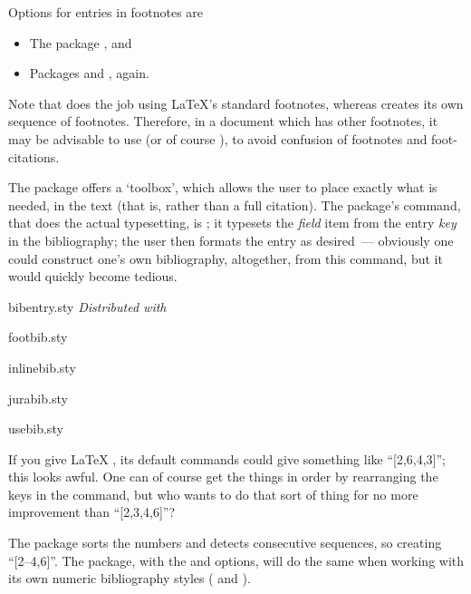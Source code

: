 Options for entries in footnotes are
\begin{itemize}
\item The package , and
\item Packages  and , again.
\end{itemize}
Note that  does the job using \LaTeX{}'s standard
footnotes, whereas  creates its own sequence of
footnotes.  Therefore, in a document which has other footnotes, it may
be advisable to use  (or of course
), to avoid confusion of footnotes and
foot-citations.

The  package offers a `toolbox', which allows the user
to place exactly what is needed, in the text (that is, rather than a
full citation).  The package's command, that does the actual
typesetting, is ; it
typesets the \emph{field} item from the entry \emph{key} in the
bibliography; the user then formats the entry as desired~--- obviously
one could construct one's own bibliography, altogether, from this
command, but it would quickly become tedious.
\begin{ctanrefs}
\item[bibentry.sty]\emph{Distributed with} 
\item[footbib.sty]
\item[inlinebib.sty]
\item[jurabib.sty]
\item[usebib.sty]
\end{ctanrefs}


If you give \LaTeX{}
, its default commands could give
something like ``[2,6,4,3]'';
this looks awful.  One can of course get the things in order by
rearranging the keys in the  command, but who wants to do
that sort of thing for no more improvement than ``[2,3,4,6]''?

The  package sorts the numbers and detects consecutive
sequences, so creating ``[2--4,6]''.  The  package,
with the  and  options, will
do the same when working with its own numeric bibliography styles
( and ).


